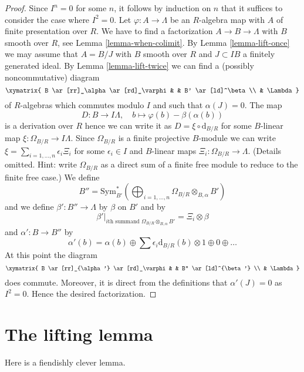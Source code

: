 \begin{proof}
Since $I^n = 0$ for some $n$, it follows by induction on $n$ that
it suffices to consider the case where $I^2 = 0$. Let
$\varphi : A \to \Lambda$ be an $R$-algebra map with $A$ of finite
presentation over $R$. We have to find a factorization $A \to B \to \Lambda$
with $B$ smooth over $R$, see Lemma \ref{lemma-when-colimit}.
By Lemma \ref{lemma-lift-once} we may assume that
$A = B/J$ with $B$ smooth over $R$ and $J \subset IB$
a finitely generated ideal. By
Lemma \ref{lemma-lift-twice}
we can find a (possibly noncommutative) diagram
$$
\xymatrix{
B \ar[rr]_\alpha \ar[rd]_\varphi & & B' \ar[ld]^\beta \\
& \Lambda
}
$$
of $R$-algebras which commutes modulo $I$ and such that $\alpha(J) = 0$.
The map
$$
D : B \longrightarrow I\Lambda,\quad
b \longmapsto \varphi(b) - \beta(\alpha(b))
$$
is a derivation over $R$ hence we can write it as
$D = \xi \circ \text{d}_{B/R}$ for some $B$-linear map
$\xi : \Omega_{B/R} \to I\Lambda$. Since $\Omega_{B/R}$ is a
finite projective $B$-module we can write
$\xi = \sum_{i = 1, \ldots, n} \epsilon_i \Xi_i$
for some $\epsilon_i \in I$ and $B$-linear maps
$\Xi_i : \Omega_{B/R} \to \Lambda$.
(Details omitted. Hint: write $\Omega_{B/R}$ as a direct sum of
a finite free module to reduce to the finite free case.)
We define
$$
B'' = \text{Sym}^*_{B'}\left(\bigoplus\nolimits_{i = 1, \ldots, n}
\Omega_{B/R} \otimes_{B, \alpha} B'\right)
$$
and we define $\beta' : B'' \to \Lambda$ by
$\beta$ on $B'$ and by
$$
\beta'|_{i\text{th summand }\Omega_{B/R} \otimes_{B, \alpha} B'} =
\Xi_i \otimes \beta
$$
and $\alpha' : B \to B''$ by
$$
\alpha'(b) =
\alpha(b) \oplus \sum \epsilon_i \text{d}_{B/R}(b) \otimes 1
\oplus 0 \oplus \ldots
$$
At this point the diagram
$$
\xymatrix{
B \ar[rr]_{\alpha'} \ar[rd]_\varphi & & B'' \ar[ld]^{\beta'} \\
& \Lambda
}
$$
does commute. Moreover, it is direct from the definitions that
$\alpha'(J) = 0$ as $I^2 = 0$. Hence the desired factorization.
\end{proof}






\section{The lifting lemma}
\label{section-lifting-lemma}

\noindent
Here is a fiendishly clever lemma.


